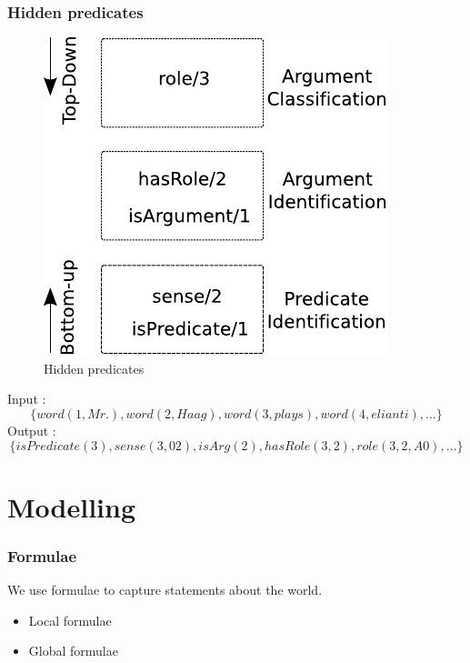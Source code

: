 \documentclass{beamer}
\begin{document}
\begin{frame}
    \frametitle{Hidden predicates}
\begin{figure}
\begin{center}
   \includegraphics[scale=.70]{TaskArchitecture}
\end{center}
\caption{Hidden predicates}
\label{fig:task}
\end{figure}

Input : \[\{word(1,Mr.),word(2,Haag), word(3,plays), word(4,elianti), \ldots \}\]
Output : \[\{isPredicate(3), sense(3,02), isArg(2), hasRole(3,2), role(3,2,A0), \ldots \}\]

\end{frame}

\section{Modelling}

\begin{frame}
    \frametitle{Formulae}
    We use formulae to capture statements about the world.

    \begin{itemize}
        \item Local formulae
        \bigskip
        \item Global formulae
    \end{itemize}
\end{frame}
\end{document}
